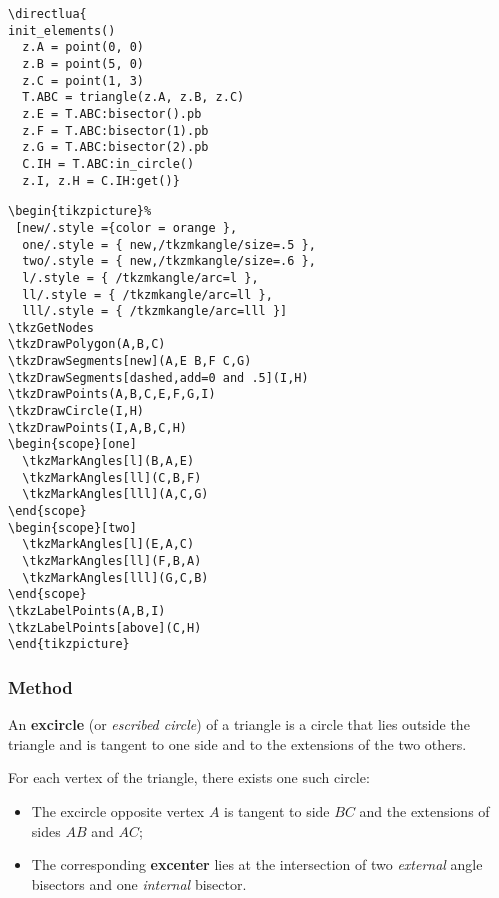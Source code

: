 \begin{minipage}{.5\textwidth}
\begin{verbatim}
\directlua{
init_elements()
  z.A = point(0, 0)
  z.B = point(5, 0)
  z.C = point(1, 3)
  T.ABC = triangle(z.A, z.B, z.C)
  z.E = T.ABC:bisector().pb
  z.F = T.ABC:bisector(1).pb
  z.G = T.ABC:bisector(2).pb
  C.IH = T.ABC:in_circle()
  z.I, z.H = C.IH:get()}
\end{verbatim}
\end{minipage}
\begin{minipage}{.5\textwidth}
\begin{verbatim}
\begin{tikzpicture}%
 [new/.style ={color = orange },
  one/.style = { new,/tkzmkangle/size=.5 },
  two/.style = { new,/tkzmkangle/size=.6 },
  l/.style = { /tkzmkangle/arc=l },
  ll/.style = { /tkzmkangle/arc=ll },
  lll/.style = { /tkzmkangle/arc=lll }]
\tkzGetNodes
\tkzDrawPolygon(A,B,C)
\tkzDrawSegments[new](A,E B,F C,G)
\tkzDrawSegments[dashed,add=0 and .5](I,H)
\tkzDrawPoints(A,B,C,E,F,G,I)
\tkzDrawCircle(I,H)
\tkzDrawPoints(I,A,B,C,H)
\begin{scope}[one]
  \tkzMarkAngles[l](B,A,E)
  \tkzMarkAngles[ll](C,B,F)
  \tkzMarkAngles[lll](A,C,G)
\end{scope}
\begin{scope}[two]
  \tkzMarkAngles[l](E,A,C)
  \tkzMarkAngles[ll](F,B,A)
  \tkzMarkAngles[lll](G,C,B)
\end{scope}
\tkzLabelPoints(A,B,I)
\tkzLabelPoints[above](C,H)
\end{tikzpicture}
\end{verbatim}
\end{minipage}



\subsubsection{Method } %
\label{ssub:method_triangle_ex__circle}

An \textbf{excircle} (or \emph{escribed circle}) of a triangle is a circle that lies outside the triangle and is tangent to one side and to the extensions of the two others.

\medskip
\noindent
For each vertex of the triangle, there exists one such circle:
\begin{itemize}
  \item The excircle opposite vertex $A$ is tangent to side $BC$ and the extensions of sides $AB$ and $AC$;
  \item The corresponding \textbf{excenter} lies at the intersection of two \emph{external} angle bisectors and one \emph{internal} bisector.
\end{itemize}

